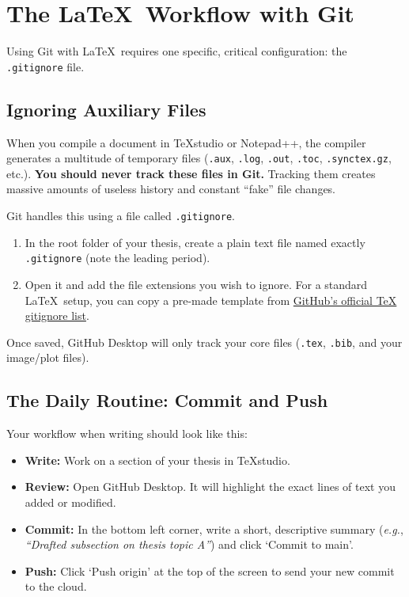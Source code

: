 	\section{The \LaTeX\ Workflow with Git}
		Using Git with \LaTeX\ requires one specific, critical configuration: the \texttt{.gitignore} file.

		\subsection{Ignoring Auxiliary Files}
			When you compile a document in TeXstudio or Notepad++, the compiler generates a multitude of temporary files (\texttt{.aux}, \texttt{.log}, \texttt{.out}, \texttt{.toc}, \texttt{.synctex.gz}, etc.). \textbf{You should never track these files in Git.} Tracking them creates massive amounts of useless history and constant ``fake'' file changes.

			Git handles this using a file called \texttt{.gitignore}. 
			\begin{enumerate}
				\item In the root folder of your thesis, create a plain text file named exactly \texttt{.gitignore} (note the leading period).
				\item Open it and add the file extensions you wish to ignore. For a standard \LaTeX\ setup, you can copy a pre-made template from \href{https://github.com/github/gitignore/blob/main/TeX.gitignore}{GitHub's official TeX gitignore list}.
			\end{enumerate}
			Once saved, GitHub Desktop will only track your core files (\texttt{.tex}, \texttt{.bib}, and your image/plot files).

		\subsection{The Daily Routine: Commit and Push}
			Your workflow when writing should look like this:
			\begin{itemize}
				\item \textbf{Write:} Work on a section of your thesis in TeXstudio.
				\item \textbf{Review:} Open GitHub Desktop. 
					It will highlight the exact lines of text you added or modified.
				\item \textbf{Commit:} In the bottom left corner, write a short, descriptive summary (\textit{e.g.}, \textit{``Drafted subsection on thesis topic A''}) and click `Commit to main'.
				\item \textbf{Push:} Click `Push origin' at the top of the screen to send your new commit to the cloud.
			\end{itemize}

